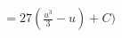 \documentclass[preview]{standalone}
\begin{document}
\begin{align*}
&=27(\frac{u^3}{3}-u)+C)
\end{align*}
\end{document}
